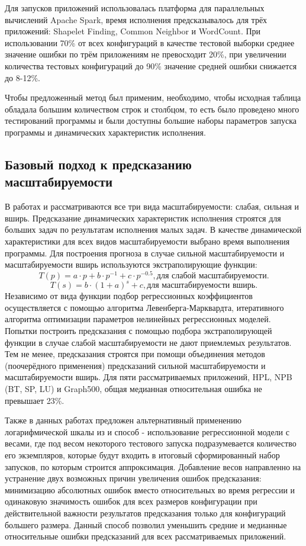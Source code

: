 		Для запусков приложений использовалась платформа для параллельных вычислений Apache Spark, время исполнения предсказывалось для трёх приложений: Shapelet Finding, Common Neighbor и WordCount. При использовании 70\% от всех конфигураций в качестве тестовой выборки среднее значение ошибки по трём приложениям не превосходит 20\%, при увеличении количества тестовых конфигураций до 90\% значение средней ошибки снижается до 8-12\%.

		Чтобы предложенный метод был применим, необходимо, чтобы исходная таблица обладала большим количеством строк и столбцом, то есть было проведено много тестирований программы и были доступны большие наборы параметров запуска программы и динамических характеристик исполнения.

	\subsection{Базовый подход к предсказанию масштабируемости}
		В работах \cite{Kazmina_Antonov_article} и \cite{Kazminf_Valkon_Antonov_article} рассматриваются все три вида масштабируемости: слабая, сильная и вширь. Предсказание динамических характеристик исполнения строятся для больших задач по результатам исполнения малых задач. В качестве динамической характеристики для всех видов масштабируемости выбрано время выполнения программы. Для построения прогноза в случае сильной масштабируемости и масштабируемости вширь используются экстраполирующие функции:
		\[
		T(p) = a \cdot p + b \cdot p^{-1} + c \cdot p^{-0.5}, \text{для слабой масштабируемости}.
		\]
		\[
		T(s) = b \cdot (1 + a)^{s} + c, \text{для масштабируемости вширь}.
		\]
		Независимо от вида функции подбор регрессионных коэффициентов осуществляется с помощью алгоритма Левенберга-Марквардта, итеративного алгоритма оптимизации параметров нелинейных регрессионных моделей. Попытки построить предсказания с помощью подбора экстраполирующей функции в случае слабой масштабируемости не дают приемлемых результатов. Тем не менее, предсказания строятся при помощи объединения методов (поочерёдного применения) предсказаний сильной масштабируемости и масштабируемости вширь. Для пяти рассматриваемых приложений, HPL, NPB (BT, SP, LU) и Graph500, общая медианная относительная ошибка не превышает 23\%. 

		Также в данных работах предложен альтернативный применению логарифмической шкалы из \cite{log_main} и \cite{focused_regression} способ - использование регрессионной модели с весами, где под весом некоторого тестового запуска подразумевается количество его экземпляров, которые будут входить в итоговый сформированный набор запусков, по которым строится аппроксимация. Добавление весов направленно на устранение двух возможных причин увеличения ошибок предсказания: минимизацию абсолютных ошибок вместо относительных во время регрессии и одинаковую значимость ошибок для всех размеров конфигурации при действительной важности результатов предсказания только для конфигураций большего размера. Данный способ позволил уменьшить средние и медианные относительные ошибки предсказаний для всех рассматриваемых приложений.

